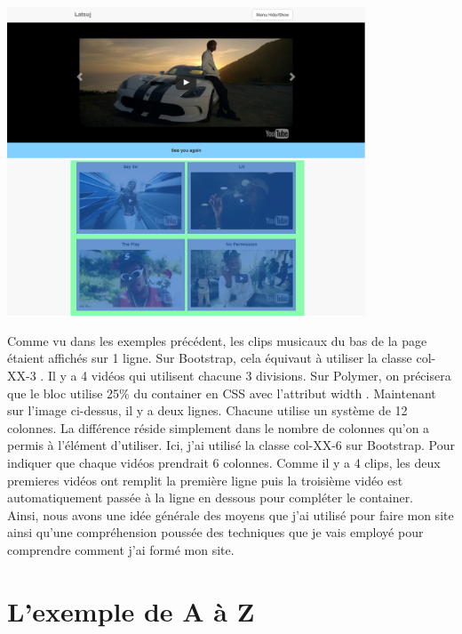 \documentclass{article}
\begin{document}
\begin{center}
\vspace{0.5cm}
\includegraphics[width=0.8\textwidth]{p13}
\vspace{0.5cm}\\
\end{center}

Comme vu dans les exemples pr\'ec\'edent, les clips musicaux du bas de la page \'etaient affich\'es sur 1 ligne. Sur Bootstrap, cela \'equivaut \`a utiliser la classe \og col-XX-3 \fg{}. Il y a 4 vid\'eos qui utilisent chacune 3 divisions. Sur Polymer, on pr\'ecisera que le bloc utilise 25\% du container en CSS avec l'attribut \og width \fg{}. Maintenant sur l'image ci-dessus, il y a deux lignes. Chacune utilise un syst\`eme de 12 colonnes. La diff\'erence r\'eside simplement dans le nombre de colonnes qu'on a permis \`a l'\'el\'ement d'utiliser. Ici, j'ai utilis\'e la classe \og col-XX-6 \fg{} sur Bootstrap. Pour indiquer que chaque vid\'eos prendrait 6 colonnes. Comme il y a 4 clips, les deux premieres vid\'eos ont remplit la premi\`ere ligne puis la troisi\`eme vid\'eo est automatiquement pass\'ee \`a la ligne en dessous pour compl\'eter le container.\\

Ainsi, nous avons une id\'ee g\'en\'erale des moyens que j'ai utilis\'e pour faire mon site ainsi qu'une compr\'ehension pouss\'ee des techniques que je vais employ\'e pour comprendre comment j'ai form\'e mon site.

\newpage
\section{L'exemple de A \`a Z}
\end{document}
